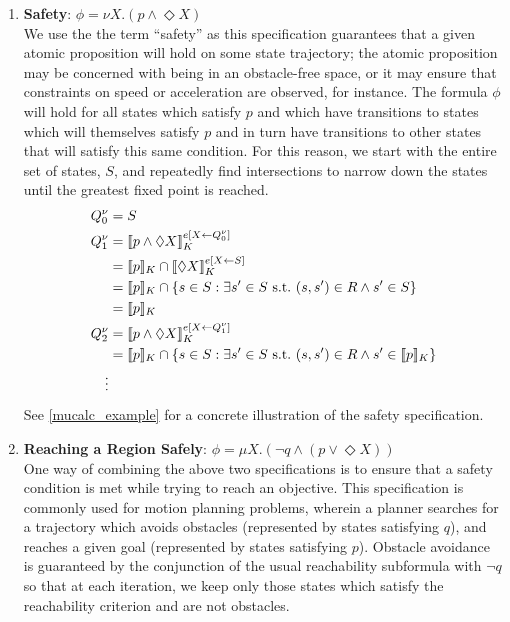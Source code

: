 \begin{enumerate}[label = (\roman*)]
    \item \textbf{Safety}: $\phi = \nu X.(p \land \Diamond X)$\label{safety_example} \\
        We use the the term ``safety'' as this specification guarantees that a given atomic proposition will hold on some state trajectory; the atomic proposition may be concerned with being in an obstacle-free space, or it may ensure that constraints on speed or acceleration are observed, for instance. The formula $\phi$ will hold for all states which satisfy $p$ and which have transitions to states which will themselves satisfy $p$ and in turn have transitions to other states that will satisfy this same condition. For this reason, we start with the entire set of states, $S$, and repeatedly find intersections to narrow down the states until the greatest fixed point is reached.
        \begin{align*}
            Q_0^\nu &= S\\
            Q_1^\nu &= {\llbracket}{} p \land \Diamond X {\rrbracket}{}_K^{e[X \leftarrow Q_0^\nu]} \\
                    &= {\llbracket}{} p {\rrbracket}{}_K \cap {\llbracket}{} \Diamond X {\rrbracket}{}_K^{e[X \leftarrow S]}\\
                    &= {\llbracket}{} p {\rrbracket}{}_K \cap \{ s \in S : \exists s' \in S \ \text{s.t.} \ (s,s') \in R \land s' \in S\} \\
                    &= {\llbracket}{} p {\rrbracket}{}_K\\
            Q_2^\nu &= {\llbracket}{} p \land \Diamond X {\rrbracket}{}_K^{e[X \leftarrow Q_1^\nu]} \\
                    &= {\llbracket}{} p {\rrbracket}{}_K \cap \{ s \in S : \exists s' \in S \ \text{s.t.} \ (s,s') \in R   \land s' \in {\llbracket}{} p {\rrbracket}{}_K\} \\
            \vdots
        \end{align*}
        See \autoref{mucalc_example} for a concrete illustration of the safety specification.


    \item \textbf{Reaching a Region Safely}: $\phi = \mu X.(\lnot q \land (p \lor \Diamond X))$\\
        One way of combining the above two specifications is to ensure that a safety condition is met while trying to reach an objective. This specification is commonly used for motion planning problems, wherein a planner searches for a trajectory which avoids obstacles (represented by states satisfying $q$), and reaches a given goal (represented by states satisfying $p$). Obstacle avoidance is guaranteed by the conjunction of the usual reachability subformula with ${\lnot q}$ so that at each iteration, we keep only those states which satisfy the reachability criterion and are not obstacles.


\end{enumerate}
